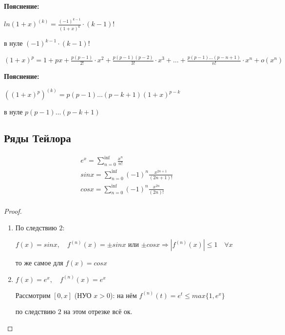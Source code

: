 \begin{center}
    \begin{flushleft}
    \textbf{Пояснение:}

    $ln(1 + x)^{(k)} = \frac{(-1)^{k-1}}{(1 + x)^k} \cdot (k - 1)!$
    
    в нуле $(-1)^{k-1} \cdot (k - 1)!$
    \end{flushleft}
    $\quad$ \\
    $(1 + x)^p = 1 + px + \frac{p(p-1)}{2!} \cdot x^2 + \frac{p(p-1)(p-2)}{3!} \cdot x^3 + \dots + \frac{p(p-1) \dots (p - n + 1)}{n!} \cdot x^n + o(x^n)$ 

    \begin{flushleft}
    \textbf{Пояснение:}

    $((1 + x)^p)^{(k)} = p(p-1) \dots (p - k + 1)(1 + x)^{p-k}$

    в нуле $p(p-1) \dots (p - k + 1)$
    \end{flushleft}
\end{center}

\subsection*{Ряды Тейлора}

\begin{gather*}
    e^x = \sum_{n = 0}^{\inf} \frac{x^n}{n!}  \\
    sin x = \sum_{n = 0}^{\inf} (-1)^n \frac{x^{2n+1}}{(2n+1)!} \\
    cos x = \sum_{n = 0}^{\inf} (-1)^n \frac{x^{2n}}{(2n)!} \\
\end{gather*}

\begin{proof}
    $\quad$ \\
    \begin{enumerate}
    \item 
    По следствию $2$:

    $f(x) = sin x, \quad f^{(n)}(x) = \pm sin x$ или $\pm cos x \Longrightarrow | f^{(n)}(x)| \leqslant 1 \quad \forall x$

    то же самое для $f(x) = cos x$

    \item 
    $f(x) = e^x, \quad f^{(n)}(x) = e^x$

    Рассмотрим $[0, x]$ (НУО $x > 0$): на нём $f^{(n)}(t) = e^t \leqslant max \{ 1, e^x \}$

    по следствию $2$ на этом отрезке всё ок.

    \end{enumerate}
\end{proof}

